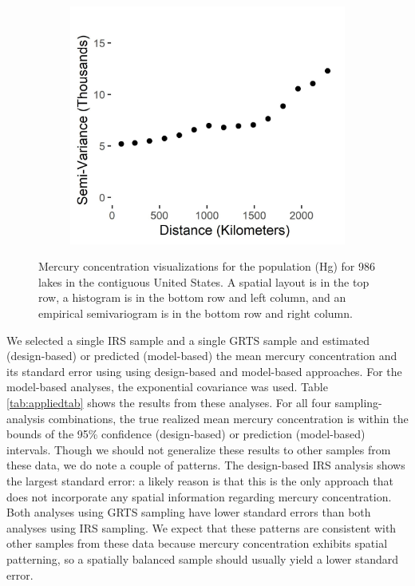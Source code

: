 \documentclass[]{elsarticle} %
\begin{document}
\begin{figure}
\begin{subfigure}{0.49\textwidth}
  \caption*{}
  \label{fig:mercury_hist}
\end{subfigure}
\begin{subfigure}{0.49\textwidth}
  \centering
  \includegraphics[width = 1\linewidth]{figures/sv_plot.jpeg}
  \caption*{}
  \label{fig:sv_plot}
\end{subfigure}
\caption{Mercury concentration visualizations for the population (Hg) for 986 lakes in the contiguous United States. A spatial layout is in the top row, a histogram is in the bottom row and left column, and an empirical semivariogram is in the bottom row and right column.}
\label{fig:merc}
\end{figure}

We selected a single IRS sample and a single GRTS sample and estimated
(design-based) or predicted (model-based) the mean mercury concentration
and its standard error using using design-based and model-based
approaches. For the model-based analyses, the exponential covariance was
used. Table \ref{tab:appliedtab} shows the results from these analyses.
For all four sampling-analysis combinations, the true realized mean
mercury concentration is within the bounds of the 95\% confidence
(design-based) or prediction (model-based) intervals. Though we should
not generalize these results to other samples from these data, we do
note a couple of patterns. The design-based IRS analysis shows the
largest standard error: a likely reason is that this is the only
approach that does not incorporate any spatial information regarding
mercury concentration. Both analyses using GRTS sampling have lower
standard errors than both analyses using IRS sampling. We expect that
these patterns are consistent with other samples from these data because
mercury concentration exhibits spatial patterning, so a spatially
balanced sample should usually yield a lower standard error.
\end{document}
